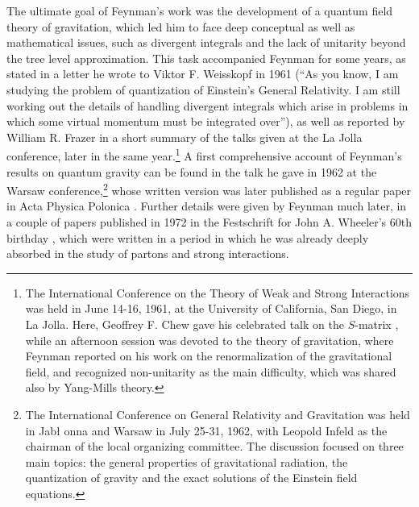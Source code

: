 \documentclass{ws-procs961x669}            %
\begin{document}
The ultimate goal of Feynman's work was the development of a
quantum field theory of gravitation, which led him to face deep
conceptual as well as mathematical issues, such as divergent
integrals and the lack of unitarity beyond the tree level
approximation. This task accompanied Feynman for some years, as
stated in a letter \cite{WeisskopfLetter} he wrote to Viktor F.
Weisskopf in 1961 (``As you know, I am studying the problem of
quantization of Einstein's General Relativity. I am still working
out the details of handling divergent integrals which arise in
problems in which some virtual momentum must be integrated
over''), as well as reported by William R. Frazer \cite{LaJolla}
in a short summary of the talks given at the La Jolla conference,
later in the same year.\footnote{The International Conference on
the Theory of Weak and Strong Interactions was held in June 14-16,
1961, at the University of California, San Diego, in La Jolla.
Here, Geoffrey F. Chew gave his celebrated talk on the $S$-matrix
\cite{Chew}, while an afternoon session was devoted to the theory
of gravitation, where Feynman reported on his work on the
renormalization of the gravitational field, and recognized
non-unitarity as the main difficulty, which was shared also by
Yang-Mills theory.} A first comprehensive account of Feynman's
results on quantum gravity can be found in the talk he gave in
1962 at the Warsaw conference,\footnote{The International
Conference on General Relativity and Gravitation was held in Jab\l
onna and Warsaw in July 25-31, 1962, with Leopold Infeld as the
chairman of the local organizing committee. The discussion focused
on three main topics: the general properties of gravitational
radiation, the quantization of gravity and the exact solutions of
the Einstein field equations.} whose written version was later
published as a regular paper in Acta Physica Polonica
\cite{Feynman:1963ax}. Further details were given by Feynman much
later, in a couple of papers \cite{WheelerFest1,WheelerFest2}
published in 1972 in the Festschrift for John A. Wheeler's 60th
birthday \cite{Klauder:1972je}, which were written in a period in
which he was already deeply absorbed in the study of partons and
strong interactions.
\end{document}

